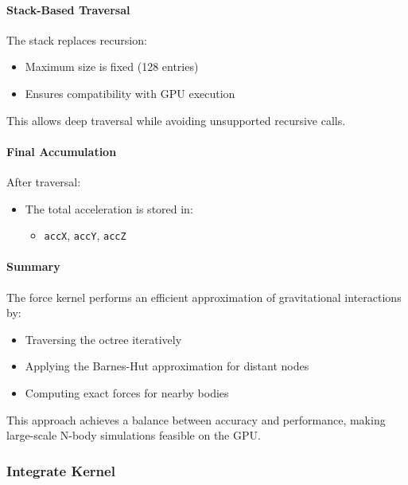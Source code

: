 \documentclass[12pt]{article}
\begin{document}
\paragraph{Stack-Based Traversal}

The stack replaces recursion:

\begin{itemize}
    \item Maximum size is fixed (128 entries)
    \item Ensures compatibility with GPU execution
\end{itemize}

This allows deep traversal while avoiding unsupported recursive calls.

\paragraph{Final Accumulation}

After traversal:

\begin{itemize}
    \item The total acceleration is stored in:
    \begin{itemize}
        \item \texttt{accX}, \texttt{accY}, \texttt{accZ}
    \end{itemize}
\end{itemize}

\paragraph{Summary}

The force kernel performs an efficient approximation of gravitational interactions by:

\begin{itemize}
    \item Traversing the octree iteratively
    \item Applying the Barnes-Hut approximation for distant nodes
    \item Computing exact forces for nearby bodies
\end{itemize}

This approach achieves a balance between accuracy and performance,
making large-scale N-body simulations feasible on the GPU.

\subsubsection{Integrate Kernel}
\end{document}
